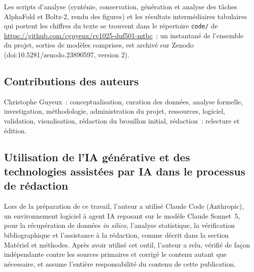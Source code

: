 \documentclass[11pt,a4paper]{article}
\begin{document}
Les scripts d'analyse (synténie, conservation, génération et analyse des tâches AlphaFold et Boltz-2, rendu des figures) et les résultats intermédiaires tabulaires qui portent les chiffres du texte se trouvent dans le répertoire \texttt{code/} de \url{https://github.com/cguyeux/rv1025-duf501-mtbc}~; un instantané de l'ensemble du projet, sorties de modèles comprises, est archivé sur Zenodo (doi:10.5281/zenodo.23890597, version 2).

\subsection*{Contributions des auteurs}

Christophe Guyeux~: conceptualisation, curation des données, analyse formelle, investigation, méthodologie, administration du projet, ressources, logiciel, validation, visualisation, rédaction du brouillon initial, rédaction~: relecture et édition.

\subsection*{Utilisation de l'IA générative et des technologies assistées par IA dans le processus de rédaction}

Lors de la préparation de ce travail, l'auteur a utilisé Claude Code (Anthropic), un environnement logiciel à agent IA reposant sur le modèle Claude Sonnet~5, pour la récupération de données \emph{in silico}, l'analyse statistique, la vérification bibliographique et l'assistance à la rédaction, comme décrit dans la section Matériel et méthodes. Après avoir utilisé cet outil, l'auteur a relu, vérifié de façon indépendante contre les sources primaires et corrigé le contenu autant que nécessaire, et assume l'entière responsabilité du contenu de cette publication.



\end{document}
